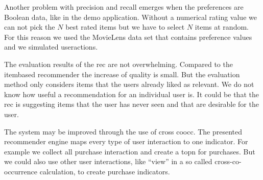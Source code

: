 Another problem with precision and recall emerges when the \glspl{preference} are Boolean data, like in the demo application. Without a numerical rating value we can not pick the $N$ best rated items but we have to select $N$ items at random. For this reason we used the MovieLens data set that contains preference values and we simulated \glspl{useraction}.

The evaluation results of the \gls{rec} are not overwhelming. Compared to the \gls{itembased} recommender the increase of quality is small. But the evaluation method only considers items that the users already liked as relevant. We do not know how useful a recommendation for an individual user is. It could be that the \gls{rec} is suggesting items that the user has never seen and that are desirable for the user.

The system may be improved through the use of cross \gls{coocc}. The presented recommender engine maps every type of user interaction to one \gls{indicator}. For example we collect all purchase interaction and create a \gls{topn} for purchases. But we could also use other user interactions, like ``view'' in a so called cross-co-occurrence calculation, to create purchase indicators. 

